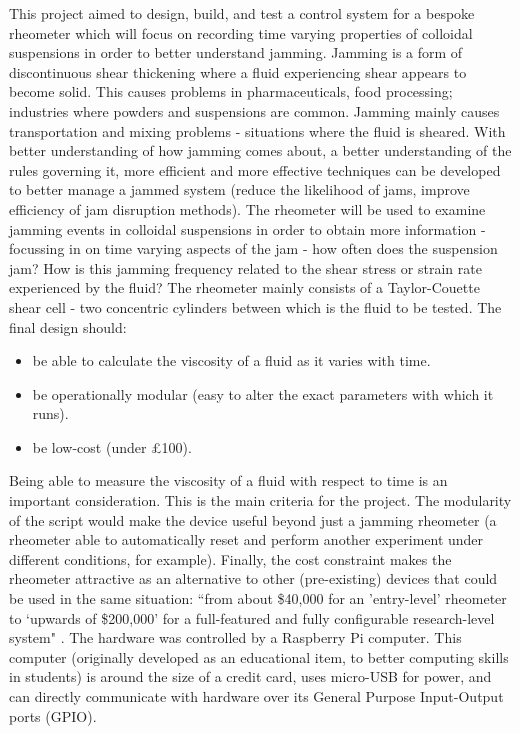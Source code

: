 \documentclass[twoside,a4]{report}
\def\br{\newline \newline \noindent}
\begin{document}
	This project aimed to design, build, and test a control system for a bespoke rheometer which will focus on recording time varying properties of colloidal suspensions in order to better understand jamming. Jamming is a form of discontinuous shear thickening where a fluid experiencing shear appears to become solid. This causes problems in pharmaceuticals, food processing; industries where powders and suspensions are common. Jamming mainly causes transportation and mixing problems - situations where the fluid is sheared. With better understanding of how jamming comes about, a better understanding of the rules governing it, more efficient and more effective techniques can be developed to better manage a jammed system (reduce the likelihood of jams, improve efficiency of jam disruption methods).
	\br
	The rheometer will be used to examine jamming events in colloidal suspensions in order to obtain more information - focussing in on time varying aspects of the jam - how often does the suspension jam? How is this jamming frequency related to the shear stress or strain rate experienced by the fluid? The rheometer mainly consists of a Taylor-Couette shear cell - two concentric cylinders between which is the fluid to be tested. The final design should:
	\begin{itemize}
		\item be able to calculate the viscosity of a fluid as it varies with time.
		\item be operationally modular (easy to alter the exact parameters with which it runs).
		\item be low-cost (under \pounds 100).
	\end{itemize}
	Being able to measure the viscosity of a fluid with respect to time is an important consideration. This is the main criteria for the project. The modularity of the script would make the device useful beyond just a jamming rheometer (a rheometer able to automatically reset and perform another experiment under different conditions, for example). Finally, the cost constraint makes the rheometer attractive as an alternative to other (pre-existing) devices that could be used in the same situation: ``from about \$40,000 for an 'entry-level' rheometer to `upwards of \$200,000' for a full-featured and fully configurable research-level system" \cite{refrheomprice}.
	\br
	The hardware was controlled by a Raspberry Pi computer. This computer (originally developed as an educational item, to better computing skills in students) is around the size of a credit card, uses micro-USB for power, and can directly communicate with hardware over its General Purpose Input-Output ports (GPIO).
\end{document}
